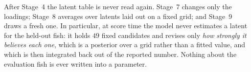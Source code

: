 \noindent After Stage~4 the latent table is never read again. Stage~7 changes
only the loadings; Stage~8 averages over latents laid out on a fixed grid; and
Stage~9 draws a fresh one. In particular, at score time the model never
estimates a latent for the held-out fish: it holds $49$ fixed candidates and
revises only \emph{how strongly it believes each one}, which is a posterior over
a grid rather than a fitted value, and which is then integrated back out of the
reported number. Nothing about the evaluation fish is ever written into a
parameter.

